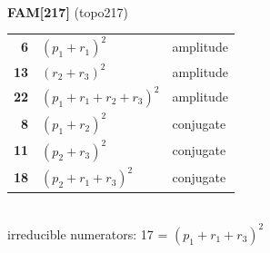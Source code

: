 \documentclass[10pt]{article}
\begin{document}
\begin{minipage}[t]{0.48\textwidth}
{}\\[2mm]\textbf{FAM[217]} (topo217)\\[2pt]{\footnotesize\begin{tabular}{@{}r@{\ \ }l@{\ \ }l@{}}\textbf{6} & $(p_1+r_1)^2$ & amplitude\\
\textbf{13} & $(r_2+r_3)^2$ & amplitude\\
\textbf{22} & $(p_1+r_1+r_2+r_3)^2$ & amplitude\\
\textbf{8} & $(p_1+r_2)^2$ & conjugate\\
\textbf{11} & $(p_2+r_3)^2$ & conjugate\\
\textbf{18} & $(p_2+r_1+r_3)^2$ & conjugate\\\end{tabular}}\\[2pt]{\scriptsize irreducible numerators: 17 = $(p_1+r_1+r_3)^2$}\end{minipage}\hfill%
\end{document}
